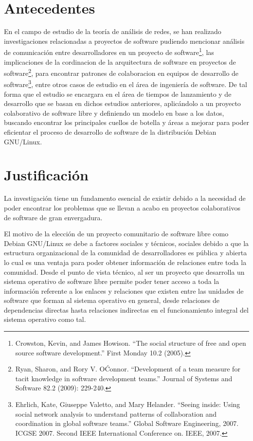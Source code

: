 \documentclass[12pt]{report}               \usepackage[utf8]{inputenc}
\begin{document}
\chapter*{Antecedentes}  En  el  campo  de estudio  de  la  teoría  de
análisis  de redes,  se han  realizado investigaciones  relacionadas a
proyectos  de software  pudiendo  mencionar  análisis de  comunicación
entre  desarrolladores en  un proyecto  de software\footnote{Crowston,
Kevin, and  James Howison.   ``The social structure  of free  and open
source  software  development.''   First  Monday  10.2  (2005).},  las
implicaciones  de la  cordinacion de  la arquitectura  de software  en
proyectos    de     software\footnote{Ryan,    Sharon,     and    Rory
V. O\'Connor. ``Development  of a team measure for  tacit knowledge in
software  development teams.''  Journal of  Systems and  Software 82.2
(2009): 229-240.}, para encontrar  patrones de colaboracion en equipos
de  desarrollo de  software\footnote{Ehrlich, Kate,  Giuseppe Valetto,
and Mary Helander.  ``Seeing inside: Using social  network analysis to
understand  patterns  of  collaboration  and  coordination  in  global
software   teams.''   Global   Software   Engineering,   2007.   ICGSE
2007.  Second IEEE  International Conference  on. IEEE,  2007.}, entre
otros casos  de estudio en el  área de ingeniería de  software. De tal
forma que el estudio se encargara en el área de tiempos de lanzamiento
y  de  desarrollo   que  se  basan  en   dichos  estudios  anteriores,
aplicándolo a un proyecto colaborativo  de software libre y definiendo
un  modelo en  base a  los datos,  buscando encontrar  los principales
cuellos de botella y áreas a  mejorar para poder eficientar el proceso
de desarrollo de software de la distribución Debian GNU/Linux.

\chapter*{Justificación} La investigación tiene un fundamento esencial
de existir debido a la necesidad  de poder encontrar los problemas que
se  llevan a  acabo en  proyectos  colaborativos de  software de  gran
envergadura.

El motivo de la elección de  un proyecto comunitario de software libre
como Debian GNU/Linux se debe a factores sociales y técnicos, sociales
debido  a  que  la  estructura   organizacional  de  la  comunidad  de
desarrolladores es pública y abierta lo cual es una ventaja para poder
obtener información  de relaciones entre  toda la comunidad.  Desde el
punto de vista  técnico, al ser un proyecto que  desarrolla un sistema
operativo  de software  libre permite  poder  tener acceso  a toda  la
información referente a los enlaces y relaciones que existen entre las
unidades de software que forman al sistema operativo en general, desde
relaciones de dependencias directas  hasta relaciones indirectas en el
funcionamiento integral del sistema operativo como tal.
\end{document}
